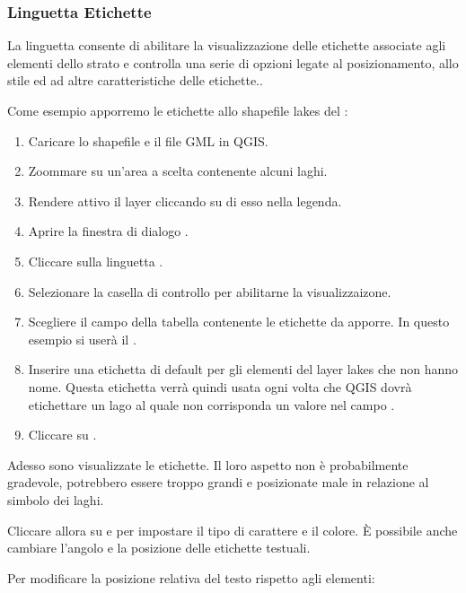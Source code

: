 \subsubsection{Linguetta Etichette}

La linguetta  consente di abilitare la visualizzazione delle
etichette associate agli elementi dello strato e controlla una serie di
opzioni legate al posizionamento, allo stile ed ad altre caratteristiche delle
etichette..

Come esempio apporremo le etichette allo shapefile lakes del
:

\begin{enumerate}
\item Caricare lo shapefile  e il file GML  in QGIS.
\item Zoommare su un'area a scelta contenente alcuni laghi.
\item Rendere attivo il layer  cliccando su di esso nella
legenda.
\item Aprire la finestra di dialogo .
\item Cliccare sulla linguetta .
\item Selezionare la casella di controllo  per
abilitarne la visualizzaizone.
\item Scegliere il campo della tabella contenente le etichette da apporre. 
  In questo esempio si userà il .
\item Inserire una etichetta di default per gli elementi del layer lakes che
non hanno nome. Questa etichetta verrà quindi usata ogni volta che QGIS dovrà
etichettare un lago al quale non corrisponda un valore nel campo .
\item Cliccare su .
\end{enumerate} 

Adesso sono visualizzate le etichette. Il loro aspetto non è probabilmente
gradevole, potrebbero essere troppo grandi e posizionate male in relazione al
simbolo dei laghi.

Cliccare allora su  e 
per impostare il tipo di carattere e il colore. È possibile anche cambiare
l'angolo e la posizione delle etichette testuali.

Per modificare la posizione relativa del testo rispetto agli elementi:

